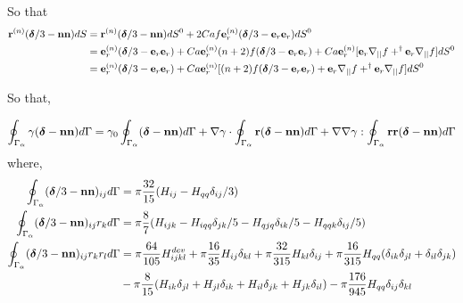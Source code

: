 So that 
\begin{align}
    \textbf{r}^{(n)}(\bm\delta/3 - \textbf{nn}) dS
    &= 
    \textbf{r}^{(n)}(\bm\delta/3 - \textbf{nn}) dS^0 
    + 2 Ca f \textbf{e}^{(n)}_r(\bm\delta/3 - \textbf{e}_r \textbf{e}_r)  dS^0 \\
    &=
    \textbf{e}_r^{(n)}(\bm\delta/3
    - \textbf{e}_r\textbf{e}_r)
    + Ca  \textbf{e}_r^{(n)} (n+2) f (\bm\delta/3 - \textbf{e}_r\textbf{e}_r)
    + Ca \textbf{e}_r^{(n)} [
        \textbf{e}_r \mathbf{\nabla}_{||} f
        + ^\dagger \textbf{e}_r \mathbf{\nabla}_{||} f
    ] dS^0 \\
    &=
    \textbf{e}_r^{(n)}(\bm\delta/3
    - \textbf{e}_r\textbf{e}_r)
    + Ca \textbf{e}_r^{(n)}
    [(n+2) f (\bm\delta/3 - \textbf{e}_r\textbf{e}_r)
    + \textbf{e}_r \mathbf{\nabla}_{||} f
    + ^\dagger \textbf{e}_r \mathbf{\nabla}_{||} f
    ] dS^0 \\
\end{align}


So that,

\begin{equation}
    \oint_{\Gamma_{\alpha}} \gamma (\bm\delta - \textbf{nn}) d\Gamma
    =
    \gamma_0 \oint_{\Gamma_{\alpha}}  (\bm\delta - \textbf{nn}) d\Gamma
    + \mathbf{\nabla}\gamma \cdot \oint_{\Gamma_{\alpha}} \textbf{r} (\bm\delta - \textbf{nn}) d\Gamma
    + \mathbf{\nabla}\mathbf{\nabla}\gamma : \oint_{\Gamma_{\alpha}} \textbf{rr} (\bm\delta - \textbf{nn}) d\Gamma
\end{equation}
where, 
\begin{align*}
    \oint_{\Gamma_{\alpha}}  (\bm\delta/3 - \textbf{nn})_{ij} d\Gamma &= \pi\frac{32}{15} (H_{ij}- H_{qq} \delta_{ij}/3)\\
    \oint_{\Gamma_{\alpha}}  (\bm\delta/3 - \textbf{nn})_{ij}r_k d\Gamma &= \pi\frac{8}{7} (H_{ijk} - H_{iqq} \delta_{jk}/5- H_{qjq} \delta_{ik}/5- H_{qqk} \delta_{ij}/5)\\
    \oint_{\Gamma_{\alpha}}  (\bm\delta/3 - \textbf{nn})_{ij}r_kr_l d\Gamma &= \pi\frac{64}{105} H_{ijkl}^{dev} 
    + \pi\frac{16}{35} H_{ij}\delta_{kl}
    + \pi\frac{32}{315} H_{kl}\delta_{ij}
    + \pi\frac{16}{315} H_{qq}(\delta_{ik}\delta_{jl}+\delta_{il}\delta_{jk})\\
    &- \pi\frac{8}{15} (H_{ik}\delta_{jl}+ H_{jl}\delta_{ik}+H_{il}\delta_{jk}+H_{jk}\delta_{il})
    - \pi\frac{176}{945} H_{qq}\delta_{ij}\delta_{kl}
\end{align*}
